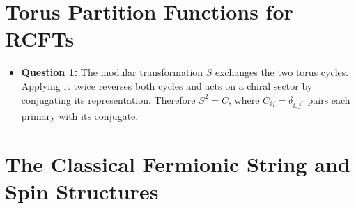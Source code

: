 \documentclass[
  10pt,
  a4paper,
  openany]{book}
\providecommand{\tightlist}{%
  \setlength{\itemsep}{0pt}\setlength{\parskip}{0pt}}
\begin{document}
\section{Torus Partition Functions for
RCFTs}\label{torus-partition-functions-for-rcfts}

\begin{itemize}
\tightlist
\item
  \textbf{Question 1:} The modular transformation \(S\) exchanges the
  two torus cycles. Applying it twice reverses both cycles and acts on a
  chiral sector by conjugating its representation. Therefore \(S^2=C\),
  where \(C_{ij}=\delta_{i,j^*}\) pairs each primary with its conjugate.
\end{itemize}

\section{The Classical Fermionic String and Spin
Structures}\label{the-classical-fermionic-string-and-spin-structures}
\end{document}
